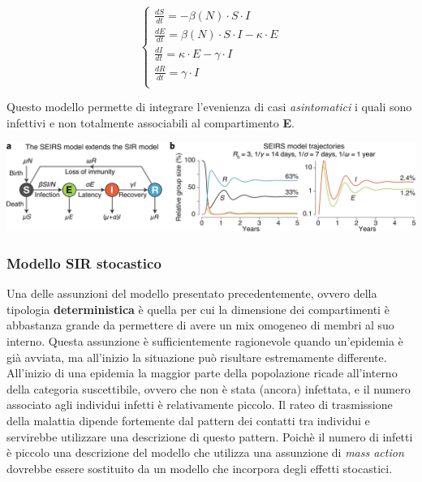 \[
    \left\{
    \begin{array}{ll}
        \frac{dS}{dt} = - \beta(N) \cdot S \cdot I\\
        \frac{dE}{dt} = \beta(N) \cdot S \cdot I - \kappa \cdot E\\
        \frac{dI}{dt} = \kappa \cdot E - \gamma \cdot I\\
        \frac{dR}{dt} = \gamma \cdot I\\
    \end{array}
    \right.
\]

Questo modello permette di integrare l'evenienza di casi \emph{asintomatici} i quali sono infettivi e non totalmente 
associabili al compartimento \textbf{E}.

\begin{minipage}{\linewidth}
    \centering
    \includegraphics[width=\textwidth]{img/41592_2020_856_Fig1_HTML.png}
    \label{fig:SEIRS_model}
\end{minipage}

\subsubsection*{Modello SIR stocastico}
Una delle assunzioni del modello presentato precedentemente, ovvero della tipologia \textbf{deterministica} è quella per cui la dimensione 
dei compartimenti è abbastanza grande da permettere di avere un mix omogeneo di membri al suo interno. Questa assunzione è sufficientemente
ragionevole quando un'epidemia è già avviata, ma all'inizio la situazione può risultare estremamente differente. All'inizio di una 
epidemia la maggior parte della popolazione ricade all'interno della categoria suscettibile, ovvero che non è stata (ancora) infettata, e il numero associato 
agli individui infetti è relativamente piccolo. Il rateo di trasmissione della malattia dipende fortemente dal pattern dei contatti tra individui e servirebbe utilizzare 
una descrizione di questo pattern. Poichè il numero di infetti è piccolo una descrizione del modello che utilizza una assunzione di \emph{mass action} dovrebbe essere 
sostituito da un modello che incorpora degli effetti stocastici.

